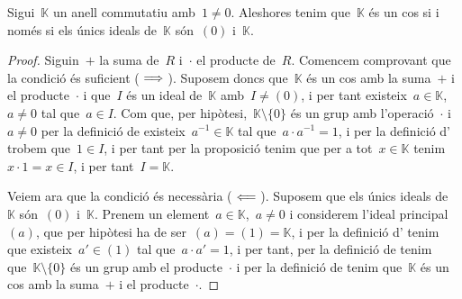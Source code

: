 \documentclass[../../main.tex]{subfiles}
\begin{document}
    \begin{proposition}
        \label{prop:condició equivalent a cos per anells}
        Sigui~\(\mathbb{K}\) un anell commutatiu amb~\(1\neq0\).
        Aleshores tenim que~\(\mathbb{K}\) és un cos si i només si els únics ideals de~\(\mathbb{K}\) són~\((0)\) i~\(\mathbb{K}\).
        \begin{proof}
            Siguin~\(+\) la suma de~\(R\) i~\(\cdot\) el producte de~\(R\).
            Comencem comprovant que la condició és suficient (\(\implies\)).
            Suposem doncs que~\(\mathbb{K}\) és un cos amb la suma~\(+\) i el producte~\(\cdot\) i que~\(I\) és un ideal de~\(\mathbb{K}\) amb~\(I\neq(0)\), i per tant existeix~\(a\in\mathbb{K}\),~\(a\neq0\) tal que~\(a\in I\).
            Com que, per hipòtesi,~\(\mathbb{K}\setminus\{0\}\) és un grup amb l'operació~\(\cdot\) i~\(a\ne0\) per la definició de  existeix~\(a^{-1}\in\mathbb{K}\) tal que~\(a\cdot a^{-1}=1\), i per la definició d' trobem que~\(1\in I\), i per tant per la proposició  tenim que per a tot~\(x\in\mathbb{K}\) tenim~\(x\cdot1=x\in I\), i per tant~\(I=\mathbb{K}\).

            Veiem ara que la condició és necessària (\(\impliedby\)).
            Suposem que els únics ideals de~\(\mathbb{K}\) són~\((0)\) i~\(\mathbb{K}\).
            Prenem un element~\(a\in\mathbb{K}\),~\(a\neq0\) i considerem l'ideal principal~\((a)\), que per hipòtesi ha de ser~\((a)=(1)=\mathbb{K}\), i per la definició d' tenim que existeix~\(a'\in(1)\) tal que~\(a\cdot a'=1\), i per tant, per la definició de  tenim que~\(\mathbb{K}\setminus\{0\}\) és un grup amb el producte~\(\cdot\) i per la definició de  tenim que~\(\mathbb{K}\) és un cos amb la suma~\(+\) i el producte~\(\cdot\).
        \end{proof}
    \end{proposition}
\end{document}
